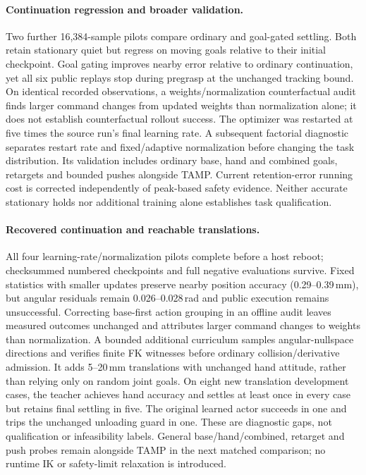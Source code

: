 \paragraph{Continuation regression and broader validation.}
Two further 16,384-sample pilots compare ordinary and goal-gated settling.
Both retain stationary quiet but regress on moving goals relative to their
initial checkpoint. Goal gating improves nearby error relative to ordinary
continuation, yet all six public replays stop during pregrasp at the unchanged
tracking bound. On identical recorded observations, a weights/normalization
counterfactual audit finds larger command changes from updated weights than
normalization alone; it does not establish counterfactual rollout success.
The optimizer was restarted at five times the source run's final learning rate.
A subsequent factorial diagnostic separates restart rate and fixed/adaptive
normalization before changing the task distribution. Its validation includes
ordinary base, hand and combined goals, retargets and bounded pushes alongside
TAMP. Current retention-error running cost is corrected independently of
peak-based safety evidence. Neither accurate stationary holds nor additional
training alone establishes task qualification.


\paragraph{Recovered continuation and reachable translations.}
All four learning-rate/normalization pilots complete before a host reboot;
checksummed numbered checkpoints and full negative evaluations survive.
Fixed statistics with smaller updates preserve nearby position accuracy
(0.29--0.39\,mm), but angular residuals remain 0.026--0.028\,rad and public
execution remains unsuccessful. Correcting base-first action grouping in an
offline audit leaves measured outcomes unchanged and attributes larger command
changes to weights than normalization. A bounded additional curriculum samples
angular-nullspace directions and verifies finite FK witnesses before ordinary
collision/derivative admission. It adds 5--20\,mm translations with unchanged
hand attitude, rather than relying only on random joint goals. On eight new
translation development cases, the teacher achieves hand accuracy and settles
at least once in every case but retains final settling in five. The original
learned actor succeeds in one and trips the unchanged unloading guard in one.
These are diagnostic gaps, not qualification or infeasibility labels. General
base/hand/combined, retarget and push probes remain alongside TAMP in the next
matched comparison; no runtime IK or safety-limit relaxation is introduced.

